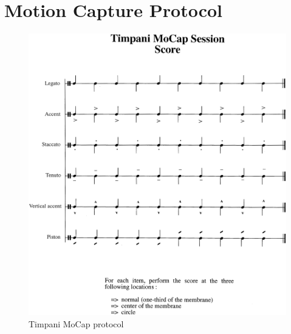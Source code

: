 \chapter{Motion Capture Protocol}
\label{chapter:MoCap}



\newpage\vfill

\begin{figure}[H]
	\begin{center}
		\includegraphics[width=\linewidth]{Appendices/B/Pics/Jpg/Score2.jpg}
	\end{center}
	\vspace{-0.5cm}
	\caption[Timpani MoCap protocol]{Timpani MoCap protocol}
	\label{fig:timpaniScore}
\end{figure}

